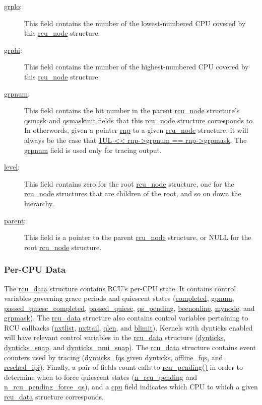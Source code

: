 \begin{description}
 \QuickQuizEnd

\item[\url{grplo}:]
	This field contains the number of the lowest-numbered CPU covered
	by this \url{rcu_node} structure.
\item[\url{grphi}:]
	This field contains the number of the highest-numbered CPU covered
	by this \url{rcu_node} structure.
\item[\url{grpnum}:]
	This field contains the bit number in the parent \url{rcu_node}
	structure's \url{qsmask} and \url{qsmaskinit} fields that this
	\url{rcu_node} structure corresponds to.
	In otherwords, given a pointer \url{rnp} to a given
	\url{rcu_node} structure, it will always be the case that
	\url{1UL << rnp->grpnum == rnp->grpmask}.
	The \url{grpnum} field is used only for tracing output.
\item[\url{level}:]
	This field contains zero for the root \url{rcu_node} structure,
	one for the \url{rcu_node} structures that are children of
	the root, and so on down the hierarchy.
\item[\url{parent}:]
	This field is a pointer to the parent \url{rcu_node} structure,
	or NULL for the root \url{rcu_node} structure.
\end{description}

\subsubsection{Per-CPU Data}
\label{app:rcuimpl:rcutreewt:Per-CPU Data}

The \url{rcu_data} structure contains RCU's per-CPU state.
It contains control variables governing grace periods and
quiescent states (\url{completed}, \url{gpnum}, \url{passed_quiesc_completed},
\url{passed_quiesc}, \url{qs_pending}, \url{beenonline}, \url{mynode},
and \url{grpmask}).
The \url{rcu_data} structure also contains control variables pertaining
to RCU callbacks
(\url{nxtlist}, \url{nxttail}, \url{qlen}, and \url{blimit}).
Kernels with dynticks enabled will have relevant control variables in
the \url{rcu_data} structure
(\url{dynticks}, \url{dynticks_snap}, and \url{dynticks_nmi_snap}).
The \url{rcu_data} structure contains event counters used by tracing
(\url{dynticks_fqs} given dynticks, \url{offline_fqs}, and \url{resched_ipi}).
Finally, a pair of fields count calls to \url{rcu_pending()} in order
to determine when to force quiescent states (\url{n_rcu_pending} and
\url{n_rcu_pending_force_qs}), and a \url{cpu} field indicates which
CPU to which a given \url{rcu_data} structure corresponds.

